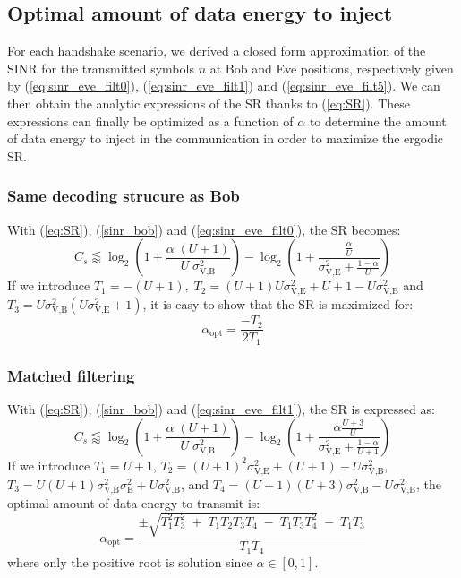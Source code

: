 \documentclass[journal,comsoc]{IEEEtran}
\begin{document}
\subsection{Optimal amount of data energy to inject}
\label{subsec:best_alpha}
For each handshake scenario, we derived a closed form approximation of the SINR for the transmitted symbols $n$ at Bob and Eve positions, respectively given by (\ref{eq:sinr_eve_filt0}), (\ref{eq:sinr_eve_filt1}) and (\ref{eq:sinr_eve_filt5}). We can  then obtain the analytic expressions of the SR thanks to (\ref{eq:SR}). These expressions can finally be optimized as a function of $\alpha$ to determine the amount of data energy to inject in the communication in order to maximize the ergodic SR.
\subsubsection{Same decoding strucure as Bob}
 With (\ref{eq:SR}), (\ref{sinr_bob}) and (\ref{eq:sinr_eve_filt0}), the SR becomes:
\begin{equation}
C_s \lessapprox \log_2 \left( 1 +  \frac{\alpha \;(U+1)}{U \; \sigma_{\text{V,B}}^2} \right) - \log_2\left( 1 + \frac{\frac{\alpha}{U}}{\sigma^2_{\text{V,E}}+\frac{1-\alpha}{U}}\right)
\label{eq:SR_anal2_decod_0}
\end{equation}
If we introduce $T_1=-(U+1),  \; T_2 = (U+1)U\sigma_{\text{V,E}}^2 + U + 1- U\sigma_{\text{V,B}}^2 $ and $T_3 = U\sigma_{\text{V,B}}^2(U\sigma_{\text{V,E}}^2+1)$, it is easy to show that the SR is maximized for:
\begin{equation}
\alpha_{\text{opt}} = \frac{-T_2}{2T_1}
\label{eq:optimal_alpha_decod_0}
\end{equation}


\subsubsection{Matched filtering}
With (\ref{eq:SR}), (\ref{sinr_bob}) and (\ref{eq:sinr_eve_filt1}), the SR is expressed as:
\begin{equation}
C_s \lessapprox \log_2 \left( 1 +  \frac{\alpha \;(U+1)}{U \; \sigma_{\text{V,B}}^2} \right) - \log_2\left( 1 +  \frac{\alpha \frac{U+3}{U}}{\sigma^2_{\text{V,E}} + \frac{1-\alpha}{U+1}}\right)
\label{eq:SR_anal2_decod_1}
\end{equation}
If we introduce $T_1 = U+1$, $T_2 = (U+1)^2\sigma_{\text{V,E}}^2 + (U+1) - U\sigma_{\text{V,B}}^2$, $T_3 = U(U+1)\sigma_{\text{V,B}}^2\sigma_{\text{E}}^2 + U \sigma_{\text{V,B}}^2$, and $T_4=(U+1)(U+3)\sigma_{\text{V,B}}^2-U\sigma_{\text{V,B}}^2$, the optimal amount of data energy to transmit is: 
\begin{equation}
\alpha_{\text{opt}} = \frac{\pm\sqrt{T_1^2 T_3^2 \; + \; T_1 T_2 T_3 T_4 \; - \; T_1 T_3 T_4^2} \; - \; T_1 T_3}{T_1 T_4}
\label{eq:optimal_alpha_decod_1}
\end{equation}
where only the positive root is solution since $\alpha \in [0,1]$.
\end{document}

